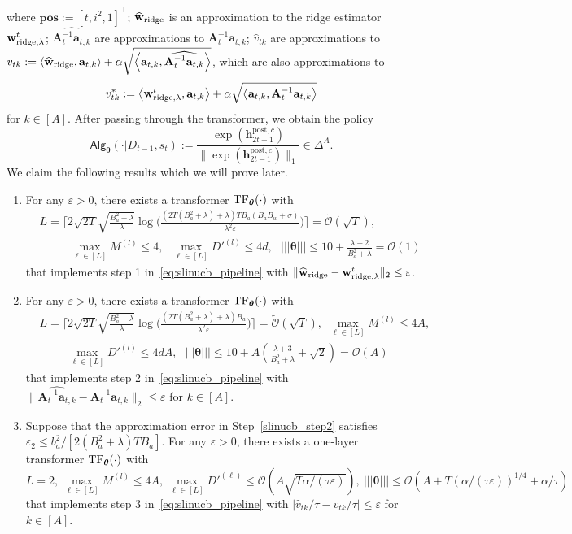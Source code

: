 \documentclass[10pt]{article}
\renewcommand{\hat}{\widehat}
\newcommand{\eps}{\varepsilon}
\renewcommand{\cO}{\mathcal{O}}
\newcommand{\<}{\left\langle}
\renewcommand{\>}{\right\rangle}
\newcommand{\lth}{{(\ell)}}
\newcommand{\TF}{{\rm TF}}
\newcommand{\ridge}{{\rm ridge}}
\newcommand{\nrmp}[1]{{\left|\!\left|\!\left|{#1}\right|\!\right|\!\right|}}
\newcommand{\posv}{{\mathbf{pos}}}
\newcommand{\post}{{\mathrm{post}}}
\newcommand{\partc}{{c}}
\newcommand{\temp}{{\tau}}
\newcommand{\tcO}{{\tilde{\mathcal O}}}
\newcommand{\state}{{s}}
\newcommand{\sAlg}{{\mathsf{Alg}}}
\newcommand{\dset}{{D}}
\newcommand{\tfpar}{{\btheta}}
\newcommand{\hidden}{{D'}}
\def\bA{{\mathbf A}}
\def\btheta{{\boldsymbol \theta}}
\def\ba{{\mathbf a}}
\def\bh{{\mathbf h}}
\def\bw{{\mathbf w}}
\begin{document}
where $\posv:=[t,i^2,1]^\top$; $\hat\bw_{\ridge}$ is an approximation to the ridge estimator $\bw^t_{\ridge,\lambda}$; $\widehat{\bA_{t}^{-1}\ba_{t,k}}$ are approximations to ${\bA_{t}^{-1}\ba_{t,k}}$;  $\hat v_{tk}$ are approximations to $v_{tk}:=\<\hat\bw_{\ridge},\ba_{t,k}\>+\alpha\sqrt{\<\ba_{t,k}, \widehat{\bA_t^{-1} \ba_{t,k}}\>}$, which are also approximations to $$
v^*_{tk}:=\<\bw^t_{\ridge,\lambda},\ba_{t,k}\>+\alpha\sqrt{\<\ba_{t,k}, {\bA_t^{-1} \ba_{t,k}}\>}
$$ for $k\in[A]$. After passing through the transformer, we obtain the policy
$$
\sAlg_{\tfpar}(\cdot|\dset_{t-1},\state_t):=\frac{\exp(\bh^{\post,\partc}_{2t-1})}{\|\exp(\bh^{\post,\partc}_{2t-1})\|_1}\in\Delta^A.$$
We claim the following results which we will prove later.
\begin{enumerate}[label=Step \arabic*,ref= \arabic*]
    \item \label{slinucb_step1} For any $\eps>0$,
    there exists a transformer $\TF_\btheta(\cdot)$ with
\begin{align*}
&L=\Big\lceil2\sqrt{2T}\sqrt{\frac{B_a^2+\lambda}{\lambda}}\log\Big(\frac{(2T(B_a^2+\lambda)+\lambda)TB_a(B_aB_w+\sigma)}{\lambda^2\eps}\Big)\Big\rceil=\tcO(\sqrt{T}),\\
&~~~\qquad\max_{\ell\in[L]}M^{(l)}\leq4,~~~\max_{\ell\in[L]}\hidden^{(l)}\leq4d,~~~ \nrmp{\btheta}\leq  10+\frac{\lambda+2}{B_a^2+\lambda}=\cO(1) \end{align*}
 that implements step 1 in~\eqref{eq:slinucb_pipeline} with  $\|\hat\bw_{\ridge}-\bw^t_{\ridge,\lambda}\|_2\leq\eps$.
   \item\label{slinucb_step2}
   For any $\eps>0$, there exists a transformer $\TF_\btheta(\cdot)$ with
\begin{align*}
&L=\Big\lceil2\sqrt{2T}\sqrt{\frac{B_a^2+\lambda}{\lambda}}\log\Big(\frac{(2T(B_a^2+\lambda)+\lambda)B_a}{\lambda^2\eps}\Big)\Big\rceil=\tcO(\sqrt{T}),~~\max_{\ell\in[L]}M^{(l)}\leq4A,\\
&\qquad~~
\max_{\ell\in[L]}\hidden^{(l)}\leq4dA,~~~ \nrmp{\btheta}\leq  10+A(\frac{\lambda+3}{B_a^2+\lambda}+\sqrt{2})=\cO(A) \end{align*}
 that implements step 2 in~\eqref{eq:slinucb_pipeline} with  $\|\widehat{\bA_{t}^{-1}\ba_{t,k}}-\bA_{t}^{-1}\ba_{t,k}\|_2\leq\eps$ for $k\in[A]$.
  \item\label{slinucb_step3} Suppose that the approximation error in Step~\ref{slinucb_step2} satisfies $\eps_2\leq b_a^2/[2(B_a^2+\lambda)TB_a]$.
  For any $\eps>0$,
  there exists a one-layer transformer $\TF_\btheta(\cdot)$ with
    $$
    L=2,~\max_{\ell\in[L]}M^{(l)}\leq 4A,~ \max_{\ell\in[L]}\hidden^\lth\leq \cO(A\sqrt{T\alpha/(\temp\eps)}),~\nrmp{\btheta}\leq  \cO(A+T({\alpha/(\temp\eps)})^{1/4}+\alpha/\temp) $$
 that implements step 3 in~\eqref{eq:slinucb_pipeline} with  $|\hat v_{tk}/\temp-v_{tk}/\temp|\leq\eps$ for $k\in[A]$.
\end{enumerate}
\end{document}
